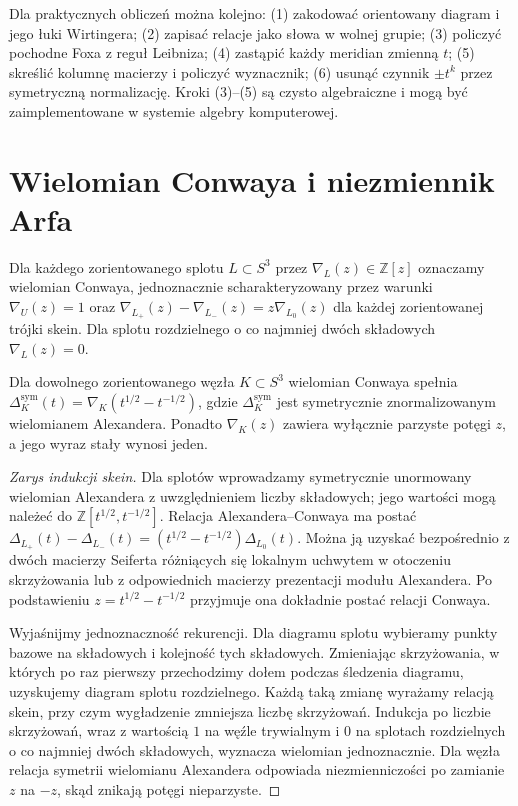 \begin{uwaga}
Dla praktycznych obliczeń można kolejno:
(1) zakodować orientowany diagram i jego łuki Wirtingera;
(2) zapisać relacje jako słowa w wolnej grupie;
(3) policzyć pochodne Foxa z reguł Leibniza;
(4) zastąpić każdy meridian zmienną $t$;
(5) skreślić kolumnę macierzy i policzyć wyznacznik;
(6) usunąć czynnik $\pm t^k$ przez symetryczną normalizację.
Kroki (3)--(5) są czysto algebraiczne i mogą być
zaimplementowane w systemie algebry komputerowej.
\end{uwaga}

\section{Wielomian Conwaya i niezmiennik Arfa}
\label{sec:kt-conway-arf}

\begin{definicja}
Dla każdego zorientowanego splotu $L\subset S^3$
przez $\nabla_L(z)\in\mathbb Z[z]$ oznaczamy
wielomian Conwaya, jednoznacznie scharakteryzowany
przez warunki $\nabla_U(z)=1$ oraz
$\nabla_{L_+}(z)-\nabla_{L_-}(z)=z\nabla_{L_0}(z)$
dla każdej zorientowanej trójki skein. Dla splotu
rozdzielnego o co najmniej dwóch składowych
$\nabla_L(z)=0$.
\end{definicja}

\begin{twierdzenie}
Dla dowolnego zorientowanego węzła $K\subset S^3$
wielomian Conwaya spełnia
$\Delta_K^{\mathrm{sym}}(t)=
\nabla_K(t^{1/2}-t^{-1/2})$,
gdzie $\Delta_K^{\mathrm{sym}}$ jest symetrycznie
znormalizowanym wielomianem Alexandera.
Ponadto $\nabla_K(z)$ zawiera wyłącznie parzyste
potęgi $z$, a jego wyraz stały wynosi jeden.
\end{twierdzenie}

\begin{proof}[Zarys indukcji skein]
Dla splotów wprowadzamy symetrycznie unormowany wielomian
Alexandera z uwzględnieniem liczby składowych; jego wartości
mogą należeć do $\mathbb Z[t^{1/2},t^{-1/2}]$. Relacja
Alexandera--Conwaya ma postać
$\Delta_{L_+}(t)-\Delta_{L_-}(t)=
(t^{1/2}-t^{-1/2})\Delta_{L_0}(t)$.
Można ją uzyskać bezpośrednio z dwóch macierzy Seiferta
różniących się lokalnym uchwytem w otoczeniu skrzyżowania
lub z odpowiednich macierzy prezentacji modułu Alexandera.
Po podstawieniu $z=t^{1/2}-t^{-1/2}$ przyjmuje ona dokładnie
postać relacji Conwaya.

Wyjaśnijmy jednoznaczność rekurencji. Dla diagramu splotu
wybieramy punkty bazowe na składowych i kolejność tych
składowych. Zmieniając skrzyżowania, w których po raz
pierwszy przechodzimy dołem podczas śledzenia diagramu,
uzyskujemy diagram splotu rozdzielnego. Każdą taką zmianę
wyrażamy relacją skein, przy czym wygładzenie zmniejsza
liczbę skrzyżowań. Indukcja po liczbie skrzyżowań, wraz
z wartością $1$ na węźle trywialnym i $0$ na splotach
rozdzielnych o co najmniej dwóch składowych, wyznacza
wielomian jednoznacznie. Dla węzła relacja symetrii
wielomianu Alexandera odpowiada niezmienniczości po
zamianie $z$ na $-z$, skąd znikają potęgi nieparzyste.
\end{proof}

